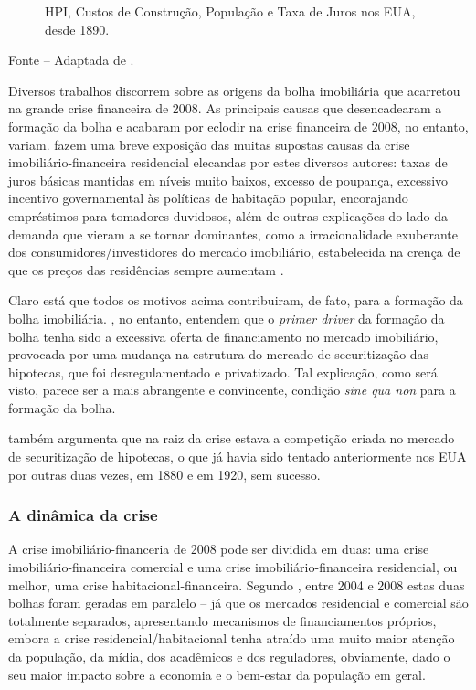 \documentclass[
	12pt,				%
	oneside,			%
	a4paper,			%
	chapter=TITLE,		%
	section=TITLE,		%
	english,			%
	brazil				%
	]{abntex2}
\newcommand{\bcenter}{\begin{center}}
\newcommand{\ecenter}{\end{center}}
\begin{document}
\begin{refsection}
\begin{figure}[H]
{}

\caption{HPI, Custos de Construção, População e Taxa de Juros nos EUA, desde 1890.}\label{fig:unnamed-chunk-18}
\end{figure}
\bcenter

\small Fonte -- Adaptada de \textcite[p.~13]{shiller}.
\ecenter

Diversos trabalhos discorrem sobre as origens da bolha imobiliária que acarretou
na grande crise financeira de 2008. As principais causas que desencadearam a
formação da bolha e acabaram por eclodir na crise financeira de 2008, no
entanto, variam. \textcite{levitin2012} fazem uma breve exposição das muitas supostas
causas da crise imobiliário-financeira residencial elecandas por estes diversos
autores: taxas de juros básicas mantidas em níveis muito baixos, excesso de
poupança, excessivo incentivo governamental às políticas de habitação popular,
encorajando empréstimos para tomadores duvidosos, além de outras explicações do
lado da demanda que vieram a se tornar dominantes, como a irracionalidade
exuberante dos consumidores/investidores do mercado imobiliário, estabelecida na
crença de que os preços das residências sempre aumentam \autocite{shiller}.

Claro está que todos os motivos acima contribuiram, de fato, para a formação da
bolha imobiliária. \textcite{levitin2012}, no entanto, entendem que o \emph{primer driver} da
formação da bolha tenha sido a excessiva oferta de financiamento no mercado
imobiliário, provocada por uma mudança na estrutura do mercado de securitização
das hipotecas, que foi desregulamentado e privatizado. Tal explicação, como será
visto, parece ser a mais abrangente e convincente, condição \emph{sine qua non} para
a formação da bolha.

\textcite{simkovic} também argumenta que na raiz da crise estava a competição criada no
mercado de securitização de hipotecas, o que já havia sido tentado anteriormente
nos EUA por outras duas vezes, em 1880 e em 1920, sem sucesso.

\hypertarget{a-dinuxe2mica-da-crise}{%
\subsubsection{A dinâmica da crise}\label{a-dinuxe2mica-da-crise}}

A crise imobiliário-financeria de 2008 pode ser dividida em duas: uma crise
imobiliário-financeira comercial e uma crise imobiliário-financeira residencial,
ou melhor, uma crise habitacional-financeira. Segundo \textcite[p.~84]{levitin2013},
entre 2004 e 2008 estas duas bolhas foram geradas em paralelo -- já que os
mercados residencial e comercial são totalmente separados, apresentando
mecanismos de financiamentos próprios, embora a crise residencial/habitacional
tenha atraído uma muito maior atenção da população, da mídia, dos acadêmicos e
dos reguladores, obviamente, dado o seu maior impacto sobre a economia e o
bem-estar da população em geral.
\begin{figure}[H]


\end{figure}
\end{refsection}
\end{document}
